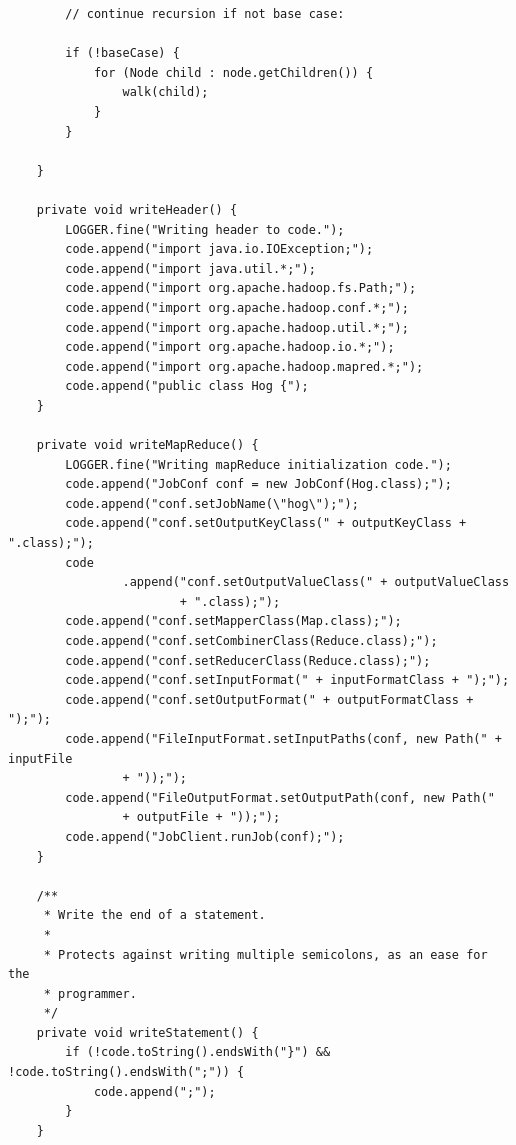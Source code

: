 \documentclass{report}
\begin{document}
\begin{verbatim}
		// continue recursion if not base case:

		if (!baseCase) {
			for (Node child : node.getChildren()) {
				walk(child);
			}
		}

	}

	private void writeHeader() {
		LOGGER.fine("Writing header to code.");
		code.append("import java.io.IOException;");
		code.append("import java.util.*;");
		code.append("import org.apache.hadoop.fs.Path;");
		code.append("import org.apache.hadoop.conf.*;");
		code.append("import org.apache.hadoop.util.*;");
		code.append("import org.apache.hadoop.io.*;");
		code.append("import org.apache.hadoop.mapred.*;");
		code.append("public class Hog {");
	}

	private void writeMapReduce() {
		LOGGER.fine("Writing mapReduce initialization code.");
		code.append("JobConf conf = new JobConf(Hog.class);");
		code.append("conf.setJobName(\"hog\");");
		code.append("conf.setOutputKeyClass(" + outputKeyClass + ".class);");
		code
				.append("conf.setOutputValueClass(" + outputValueClass
						+ ".class);");
		code.append("conf.setMapperClass(Map.class);");
		code.append("conf.setCombinerClass(Reduce.class);");
		code.append("conf.setReducerClass(Reduce.class);");
		code.append("conf.setInputFormat(" + inputFormatClass + ");");
		code.append("conf.setOutputFormat(" + outputFormatClass + ");");
		code.append("FileInputFormat.setInputPaths(conf, new Path(" + inputFile
				+ "));");
		code.append("FileOutputFormat.setOutputPath(conf, new Path("
				+ outputFile + "));");
		code.append("JobClient.runJob(conf);");
	}

	/**
	 * Write the end of a statement.
	 * 
	 * Protects against writing multiple semicolons, as an ease for the
	 * programmer.
	 */
	private void writeStatement() {
		if (!code.toString().endsWith("}") && !code.toString().endsWith(";")) {
			code.append(";");
		}
	}


\end{verbatim}
\end{document}
